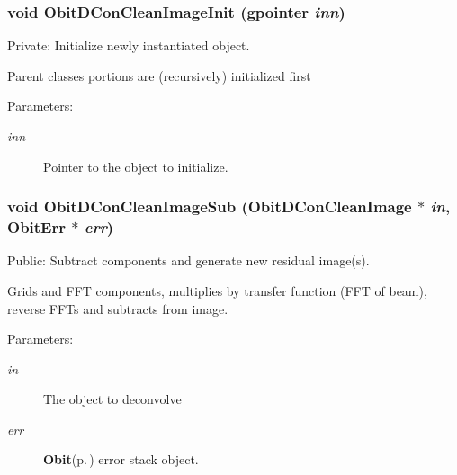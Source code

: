 \subsubsection{\setlength{\rightskip}{0pt plus 5cm}void Obit\-DCon\-Clean\-Image\-Init (gpointer {\em inn})}\label{ObitDConCleanImage_8c_a3}


Private: Initialize newly instantiated object. 

Parent classes portions are (recursively) initialized first \begin{Desc}
\item[Parameters:]
\begin{description}
\item[{\em inn}]Pointer to the object to initialize. \end{description}
\end{Desc}
\subsubsection{\setlength{\rightskip}{0pt plus 5cm}void Obit\-DCon\-Clean\-Image\-Sub ({\bf Obit\-DCon\-Clean\-Image} $\ast$ {\em in}, {\bf Obit\-Err} $\ast$ {\em err})}\label{ObitDConCleanImage_8c_a14}


Public: Subtract components and generate new residual image(s). 

Grids and FFT components, multiplies by transfer function (FFT of beam), reverse FFTs and subtracts from image. \begin{Desc}
\item[Parameters:]
\begin{description}
\item[{\em in}]The object to deconvolve \item[{\em err}]{\bf Obit}{\rm (p.\,\pageref{structObit})} error stack object. \end{description}
\end{Desc}
